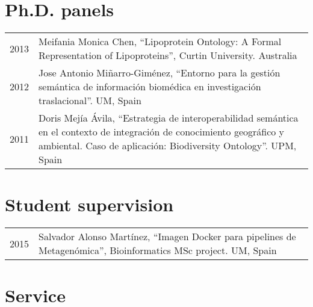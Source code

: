 \documentclass[11pt,fullpage]{article}
\begin{document}
\section*{Ph.D. panels}

\begin{longtable}{p{0.5in}|p{5.5in}}

2013 & Meifania Monica Chen, ``Lipoprotein Ontology: A Formal Representation of Lipoproteins'', Curtin University. Australia \\

2012 & Jose Antonio Mi\~narro-Gim\'enez, ``Entorno para la gesti\'on sem\'antica de informaci\'on biom\'edica en investigaci\'on traslacional''. UM, Spain \\

2011 & Doris Mej\'ia \'Avila, ``Estrategia de interoperabilidad sem\'antica en el contexto de integraci\'on de conocimiento geogr\'afico y ambiental. Caso de aplicaci\'on: Biodiversity Ontology''. UPM, Spain \\

\end{longtable}


\section*{Student supervision}

\begin{longtable}{p{0.5in}|p{5.5in}}

2015 &  Salvador Alonso Martínez, ``Imagen Docker para pipelines de Metagen\'omica'', Bioinformatics MSc project. UM, Spain \\

\end{longtable}


\section*{Service}

\end{document}
